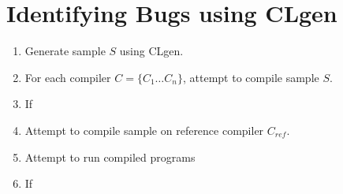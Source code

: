 






\section{Identifying Bugs using CLgen}

\begin{enumerate}
	\item Generate sample $S$ using CLgen.
	\item For each compiler $C = \{C_1 \ldots C_n\}$, attempt to compile sample $S$.
	\item If 
	\item Attempt to compile sample on reference compiler $C_{ref}$.
	\item Attempt to run compiled programs
	\item If 
\end{enumerate}



\printbibliography
        
